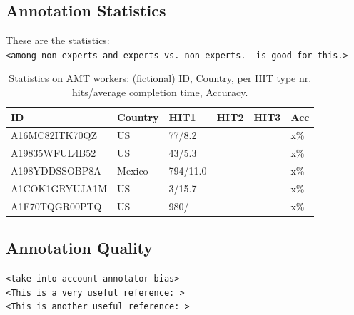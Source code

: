 \documentclass[11pt,letterpaper]{article}
\begin{document}
\subsection{Annotation Statistics}

These are the statistics:\\
\texttt{<among non-experts and experts vs. non-experts. \cite{snow_cheap_2008} is good for this.>}

\begin{table}
\begin{scriptsize}
\begin{tabular}{|l|l|l|l|l|l|}
 \hline
 ID & Country & HIT1 & HIT2 & HIT3 & Acc \\ \hline
 A16MC82ITK70QZ & US & 77/8.2 &  &  & x\% \\
 A19835WFUL4B52 & US & 43/5.3 &  &  & x\% \\
 A198YDDSSOBP8A & Mexico & 794/11.0 &  &  & x\% \\
 A1COK1GRYUJA1M & US & 3/15.7 &  &  & x\% \\
 A1F70TQGR00PTQ & US & 980/ &  &  & x\% \\
 \hline
\end{tabular}
\end{scriptsize}
\caption{\small Statistics on AMT workers: (fictional) ID, Country, per HIT type nr. hits/average completion time, Accuracy.}
\label{table.stats}
\end{table}




\subsection{Annotation Quality}
\texttt{<take into account annotator bias>} \\
\texttt{<This is a very useful reference: \cite{dawid_maximum_1979}>} \\
\texttt{<This is another useful reference: \cite{mason_financial_2009}>}

\end{document}
